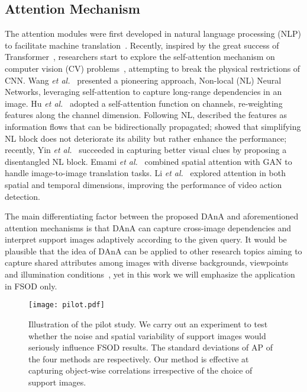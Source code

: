 \documentclass[journal]{IEEEtran}
\newcommand{\etal}{\textit{et al.}}
\begin{document}
\subsection{Attention Mechanism}
The attention modules were first developed in natural language processing (NLP) to facilitate machine translation~\cite{bahdanau2014neural, luong2015effective, gehring2017convolutional}.
Recently, inspired by the great success of Transformer~\cite{vaswani2017attention}, researchers start to explore the self-attention mechanism on computer vision (CV) problems~\cite{wang2018non, zhao2018psanet, fu2019dual, cao2019gcnet, hu2019local, zhu2019empirical}, attempting to break the physical restrictions of CNN.
Wang \etal~\cite{wang2018non} presented a pioneering approach, Non-local (NL) Neural Networks, leveraging self-attention to capture long-range dependencies in an image.
Hu \etal~\cite{hu2018squeeze} adopted a self-attention function on channels, re-weighting features along the channel dimension.
Following NL, \cite{zhao2018psanet} described the features as information flows that can be bidirectionally propagated; \cite{cao2019gcnet} showed that simplifying NL block does not deteriorate its ability but rather enhance the performance; recently, Yin \etal~\cite{yin2020disentangled} succeeded in capturing better visual clues by proposing a disentangled NL block.
Emami \etal~\cite{emami2020spa} combined spatial attention with GAN to handle image-to-image translation tasks.
Li \etal~\cite{li2020spatio} explored attention in both spatial and temporal dimensions, improving the performance of video action detection.


The main differentiating factor between the proposed DAnA and aforementioned attention mechanisms is that DAnA can capture cross-image dependencies and interpret support images adaptively according to the given query.
It would be plausible that the idea of DAnA can be applied to other research topics aiming to capture shared attributes among images with diverse backgrounds, viewpoints and illumination conditions~\cite{zhang2015self, han2017unified, fan2021group}, yet in this work we will emphasize the application in FSOD only.


\begin{figure}[t]
    \centering
    \texttt{[image: pilot.pdf]}
    \caption{
    Illustration of the pilot study.
    We carry out an experiment to test whether the noise and spatial variability of support images would seriously influence FSOD results.
    The standard deviations of AP of the four methods are  respectively.
    Our method is effective at capturing object-wise correlations irrespective of the choice of support images.
    }
    \label{fig:pilot}
\end{figure}
\end{document}
